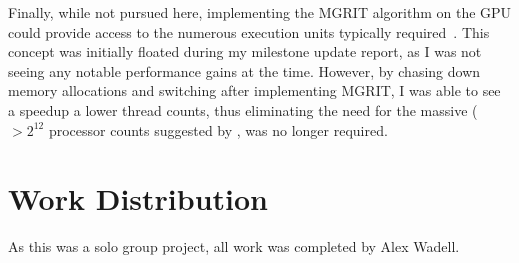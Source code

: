 \documentclass{article}
\begin{document}
Finally, while not pursued here, implementing the MGRIT algorithm on the GPU could provide access to the numerous execution units typically required~\cite{friedhoffMULTIGRIDINTIMEALGORITHMSOLVING}.
This concept was initially floated during my milestone update report, as I was not seeing any notable performance gains at the time.
However, by chasing down memory allocations and switching after implementing MGRIT, I was able to see a speedup a lower thread counts, thus eliminating the need for the massive (\(>2^{12}\) processor counts suggested by \citeauthor{friedhoffMULTIGRIDINTIMEALGORITHMSOLVING}, was no longer required.


\section{Work Distribution}

As this was a solo group project, all work was completed by Alex Wadell.

\clearpage
\printbibliography
\end{document}
